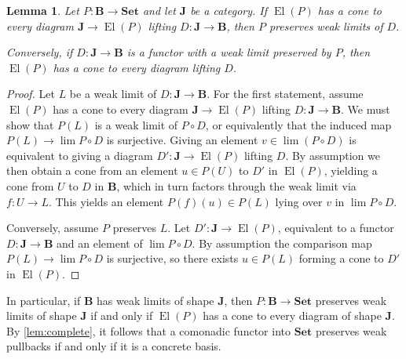 \documentclass[11pt, oneside, article]{memoir}
\theoremstyle{plain}
\newtheorem{lemma}[theorem]{Lemma}
\theoremstyle{definition}
\theoremstyle{remark}
\DeclareMathOperator{\El}{El}
\newcommand{\namedcat}[1]{\mathbf{#1}}
\newcommand{\cat}[1]{\mathbf{#1}}
\newcommand{\Set}{\namedcat{Set}}
\newcommand{\ph}[1]{#1}
\newcommand{\xU}{U}
\newcommand{\bB}{\cat{B}}
\newcommand{\bJ}{\cat{J}}
\newcommand{\pP}{\ph{P}}
\begin{document}
\begin{lemma}\label{lem:weakel}
  Let $\pP \colon \bB \to \Set$ and let $\bJ$ be a category. If
  $\El(\pP)$ has a cone to every diagram $\bJ \to \El(\pP)$
  lifting $D \colon \bJ \to \bB$, then $\pP$ preserves weak limits
  of $D$.

  Conversely, if $D \colon \bJ \to \bB$ is a functor with a weak
  limit preserved by $\pP$, then $\El(\pP)$ has a cone to every
  diagram lifting $D$.
\end{lemma}
\begin{proof}
  Let $L$ be a weak limit of $D \colon \bJ \to \bB$.  For the
  first statement, assume $\El(\pP)$ has a cone to every diagram
  $\bJ \to \El(\pP)$ lifting $D \colon \bJ \to \bB$. We must
  show that $\pP(L)$ is a weak limit of $\pP \circ D$, or equivalently
  that the induced map $\pP(L) \to \lim \pP \circ D$ is
  surjective. Giving an element $v \in \lim (\pP \circ D)$ is
  equivalent to giving a diagram $D' \colon \bJ \to \El(\pP)$
  lifting $D$. By assumption we then obtain a cone from an element
  $u \in \pP(\xU)$ to $D'$ in $\El(\pP)$, yielding a cone from $\xU$
  to $D$ in $\bB$, which in turn factors through the weak limit via
  $f \colon U \to L$. This yields an element $\pP(f)(u) \in \pP(L)$
  lying over $v$ in $\lim \pP \circ D$.

  Conversely, assume $\pP$ preserves $L$. Let
  $D' \colon \bJ \to \El(\pP)$, equivalent to a functor
  $D \colon \bJ \to \bB$ and an element of $\lim \pP \circ D$. By
  assumption the comparison map $\pP(L) \to \lim \pP \circ D$ is
  surjective, so there exists $u \in \pP(L)$ forming a cone to $D'$ in
  $\El(\pP)$.
\end{proof}

In particular, if $\bB$ has weak limits of shape $\bJ$, then
$\pP \colon \bB \to \Set$ preserves weak limits of shape $\bJ$ if
and only if $\El(\pP)$ has a cone to every diagram of shape
$\bJ$. By \cref{lem:complete}, it follows that a comonadic functor
into $\Set$ preserves weak pullbacks if and only if it is a concrete
basis.
\end{document}
